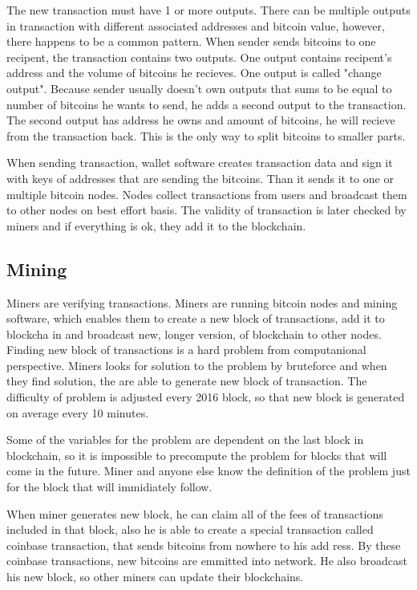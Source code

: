 \documentclass[
  digital, %
  table,   %
  lof,     %
  lot,     %
  oneside
]{fithesis3}
\begin{document}
The new transaction must have 1 or more outputs.
There can be multiple outputs in transaction with different associated addresses and bitcoin value,
however, there happens to be a common pattern. When sender sends bitcoins to one recipent,
the transaction contains two outputs.
One output contains recipent's address and the volume of bitcoins he recieves.
One output is called "change output". Because sender usually doesn't own outputs 
 that sums to be equal to number of bitcoins he wants to send, he adds a second output
 to the transaction. The second output has address he owns and amount of bitcoins, he will recieve from the transaction back.
 This is the only way to split bitcoins to smaller parts. 

When sending transaction,
 wallet software creates transaction data and sign it with keys of addresses that are sending the bitcoins.
 Than it sends it to one or multiple bitcoin nodes.
Nodes collect transactions from users and broadcast them to other nodes on best effort basis.
The validity of transaction is later checked by miners and if everything is ok, they add it to the blockchain.

\subsection{Mining}

Miners are verifying transactions.
Miners are running bitcoin nodes and mining software, which enables them to create a new block of transactions, add it to blockcha
in and broadcast new, longer version, of blockchain to other nodes.
Finding new block of transactions is a hard problem from computanional perspective.
Miners looks for solution to the problem by bruteforce and when they find solution, the are able to generate
new block of transaction. The difficulty of problem is adjusted every 2016 block,
so that new block is generated on average every 10 minutes.

Some of the variables for the problem are dependent on the last block in blockchain, so it is impossible
to precompute the problem for blocks that will come in the future. 
Miner and anyone else know the definition of the problem just for the block that will immidiately follow.

When miner generates new block, he can claim all of the fees of transactions included in that block,
also he is able to create a special transaction called coinbase transaction, that sends bitcoins from nowhere to his add
ress. By these coinbase transactions, new bitcoins are emmitted into network.
He also broadcast his new block, so other miners can update their blockchains. 
\end{document}
